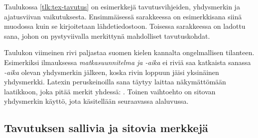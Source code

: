 
Taulukossa \ref{tlk:tex-tavutus} on esimerkkejä tavutusvihjeiden,
yhdysmerkin ja ajatusviivan vaikutuksesta. Ensimmäisessä sarakkeessa on
esimerkkisana siinä muodossa kuin se kirjoitetaan lähdetiedostoon.
Toisessa sarakkeessa on ladottu sana, johon on pystyviivalla merkittynä
mahdolliset tavutuskohdat.

Taulukon viimeinen rivi paljastaa suomen kielen kannalta ongelmallisen
tilanteen. Esimerkiksi ilmauksessa \emph{matkasuunnitelma ja
  \mbox{-aika}} ei riviä saa katkaista sanassa \emph{\mbox{-aika}}
olevan yhdysmerkin jälkeen, koska rivin loppuun jäisi yksinäinen
yhdysmerkki. Latexin peruskeinoilla sana täytyy laittaa näkymättömään
laatikkoon, joka pitää merkit yhdessä: \mbox{}.
Toinen vaihtoehto on sitovan yhdysmerkin käyttö, jota käsitellään
seuraavassa alaluvussa.

\subsection{Tavutuksen sallivia ja sitovia merkkejä}
\label{luku:tavutus_sallivat_sitovat}

